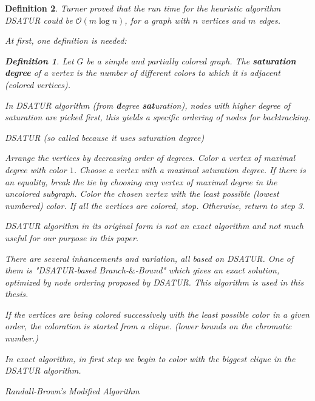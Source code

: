 \documentclass[12pt]{article}
\theoremstyle{slplain}
\newtheorem{defi}{Definition}[section]
\begin{document}
\begin{defi}
Turner \cite{turner} proved that the run time for the heuristic algorithm DSATUR could be $\mathcal{O}(m \log n)$, for a graph with $n$ vertices and $m$ edges.

At first, one definition is needed:

\begin{defi}
Let $G$ be a simple and partially colored graph. The {\bf saturation degree} of a vertex is the number of different colors to which it is adjacent (colored vertices).\cite{brelaz}
\end{defi}

In DSATUR algorithm (from {\bf d}egree {\bf sat}uration), nodes with higher degree of saturation are picked first, this yields a specific ordering of nodes for backtracking.

\vspace{1cm}

\begin{algorithm}[H]
\SetAlgoLined
\DontPrintSemicolon
  \caption{DSATUR (so called because it uses saturation degree)\cite{brelaz}}

  Arrange the vertices by decreasing order of degrees.\;
   Color a vertex of maximal degree with color $1$.\;
  Choose a vertex with a maximal saturation degree. If there is an
equality, break the tie by choosing any vertex of maximal degree in the uncolored
subgraph.\;
    Color the chosen vertex with the least possible (lowest numbered)
color.\;
  If all the vertices are colored, stop. Otherwise, return to step 3.\;
 
\end{algorithm}

\newpage

DSATUR algorithm in its original form is not an exact algorithm and not much useful for our purpose in this paper. 

There are several inhancements and variation, all based on DSATUR. One of them is "DSATUR-based Branch-$\&$-Bound" which gives an exact solution, optimized by node ordering proposed by DSATUR. This algorithm is used in this thesis.

If the vertices are being colored successively with the least possible color in a
given order, the coloration is started from a clique. (lower bounds on the 
chromatic number.)

In exact algorithm, in first step we begin to color with the biggest clique in the DSATUR algorithm.



\newpage
{}
\begin{algorithm}[H]
\SetAlgoLined
\DontPrintSemicolon
  \caption{Randall-Brown's Modified Algorithm\cite{randall}}
  

\end{algorithm}
\end{defi}
\end{document}
